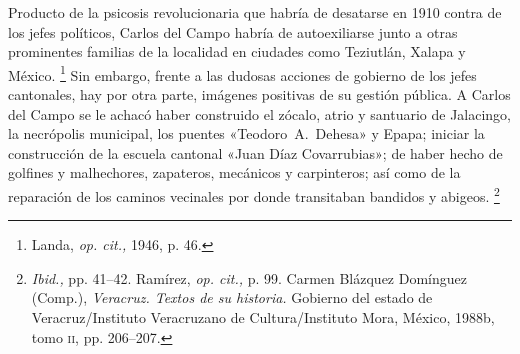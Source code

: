 \documentclass[14pt,twoside,final]{extbook} %
\let\oldfootnote\footnote
\renewcommand\footnote[1]{%
\oldfootnote{\hspace{1mm}#1}}
\begin{document}
Producto de la psicosis revolucionaria que habría de desatarse en 1910 contra de los jefes políticos, Carlos del Campo habría de autoexiliarse junto a otras prominentes familias de la localidad en ciudades como Teziutlán, Xalapa y México.\footnote{Landa, \emph{op. cit.,} 1946, p. 46.} Sin embargo, frente a las dudosas acciones de gobierno de los jefes cantonales, hay por otra parte, imágenes positivas de su gestión pública. A Carlos del Campo se le achacó haber construido el zócalo, atrio y santuario de Jalacingo, la necrópolis municipal, los puentes «\mbox{Teodoro A. Dehesa}» y Epapa; iniciar la construcción de la escuela cantonal «Juan Díaz Covarrubias»; de haber hecho de golfines y malhechores, zapateros, mecánicos y carpinteros; así como de la reparación de los caminos vecinales por donde transitaban bandidos y abigeos.\footnote{\emph{Ibid.,} pp. 41--42. Ramírez, \emph{op. cit.,} p. 99. Carmen Blázquez Domínguez (Comp.), \emph{Veracruz. Textos de su historia.} Gobierno del estado de Veracruz/Instituto Veracruzano de Cultura/Instituto Mora, México, 1988b, tomo \textsc{ii}, pp. 206--207.} \pagebreak[4]
\end{document}
